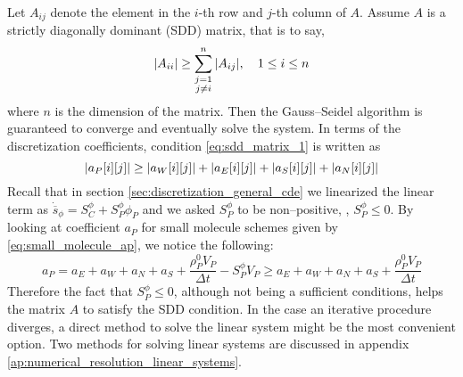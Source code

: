 Let $A_{ij}$ denote the element in the $i$-th row and $j$-th column of $A$.
Assume $A$ is a strictly diagonally dominant (SDD) matrix, that is to say,
\begin{equation} \label{eq:sdd_matrix_1}
	\abs{A_{ii}} \geq 
	\sum_{\substack{j = 1 \\ j \neq i}}^n \abs{A_{ij}}, \quad 1 \leq i \leq n
\end{equation}
where $n$ is the dimension of the matrix. Then the Gauss--Seidel algorithm is
guaranteed to converge and eventually solve the system. In terms of the
discretization coefficients, condition \eqref{eq:sdd_matrix_1} is written as
\begin{equation}
	\abs{a_P[i][j]} \geq 
	\abs{a_W[i][j]} +
	\abs{a_E[i][j]} +
	\abs{a_S[i][j]} +
	\abs{a_N[i][j]}
\end{equation}
Recall that in section \ref{sec:discretization_general_cde} we linearized the
linear term as $\dot{\overline{s}}_\phi = S_C^\phi + S_P^\phi \phi_P$ and we
asked $S_P^\phi$ to be non--positive, \ie, $S_P^\phi \leq 0$. By looking at
coefficient $a_P$ for small molecule schemes given by
\eqref{eq:small_molecule_ap}, we notice the following:
\begin{equation}
	a_P = 
	a_E + a_W + a_N + a_S + \frac{\rho_P^0 V_P}{\Delta t} - S_P^\phi V_P \geq
	a_E + a_W + a_N + a_S + \frac{\rho_P^0 V_P}{\Delta t}
\end{equation}
Therefore the fact that $S_P^\phi \leq 0$, although not being a sufficient
conditions, helps the matrix $A$ to satisfy the SDD condition. In the case an
iterative procedure diverges, a direct method to solve the linear system might
be the most convenient option. Two methods for solving linear systems are
discussed in appendix \ref{ap:numerical_resolution_linear_systems}.
